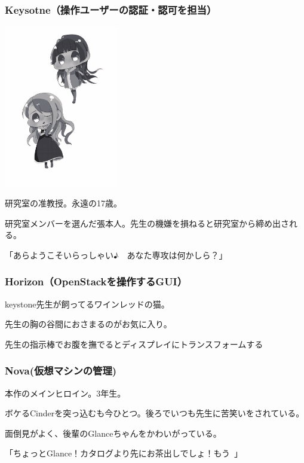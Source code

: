 \documentclass[9pt,b5paper,tombo,openany]{jsbook}
\begin{document}
\subsubsection{Keysotne（操作ユーザーの認証・認可を担当）}

\begin{floatingfigure}[r]{5cm}
  \includegraphics[width=5cm]{./img/char1.pdf}
\end{floatingfigure}

研究室の准教授。永遠の17歳。

研究室メンバーを選んだ張本人。先生の機嫌を損ねると研究室から締め出される。

「あらようこそいらっしゃい♪　あなた専攻は何かしら？」

\subsubsection{Horizon（OpenStackを操作するGUI）}

keystone先生が飼ってるワインレッドの猫。

先生の胸の谷間におさまるのがお気に入り。

先生の指示棒でお腹を撫でるとディスプレイにトランスフォームする

\subsubsection{Nova(仮想マシンの管理)}

本作のメインヒロイン。3年生。

ボケるCinderを突っ込むも今ひとつ。後ろでいつも先生に苦笑いをされている。

面倒見がよく、後輩のGlanceちゃんをかわいがっている。

「ちょっとGlance！カタログより先にお茶出しでしょ！もう~」
\end{document}
